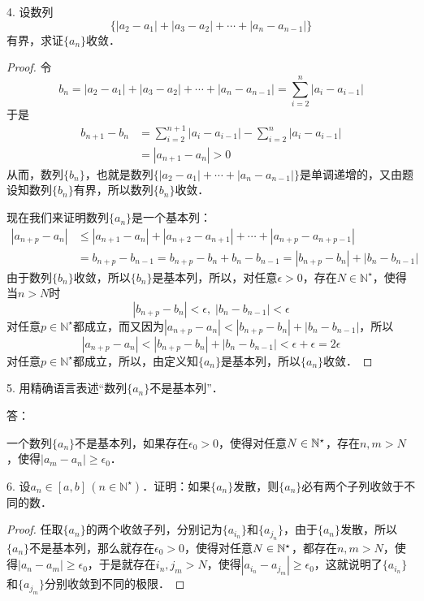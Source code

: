 4. 设数列
\begin{equation}
    \{|a_2-a_1|+|a_3-a_2|+\cdots+|a_n-a_{n-1}|\}
\end{equation}
有界，求证$\{a_n\}$收敛．
\begin{proof}
令
\begin{equation}
    b_n = |a_2-a_1|+|a_3-a_2|+\cdots+|a_n-a_{n-1}| =\sum_{i=2}^n |a_{i}-a_{i-1}|
\end{equation}
于是
\begin{align}
    b_{n+1}-b_n &= \sum_{i=2}^{n+1} |a_i - a_{i-1}| -\sum_{i=2}^{n} |a_i-a_{i-1}| \\
    &= |a_{n+1}-a_{n}| > 0
\end{align}
从而，数列$\{b_n\}$，也就是数列$\{|a_2-a_1|+\cdots+|a_{n}-a_{n-1}|\}$是单调递增的，又由题设知数列$\{b_n\}$有界，所以数列$\{b_n\}$收敛．

现在我们来证明数列$\{a_n\}$是一个基本列：
\begin{align}
    |a_{n+p}-a_n| &\leq |a_{n+1}-a_n|+|a_{n+2}-a_{n+1}|+\cdots+|a_{n+p}-a_{n+p-1}| \\
    &= b_{n+p} - b_{n-1} = b_{n+p} - b_n + b_{n} - b_{n-1} = |b_{n+p}-b_n|+|b_n-b_{n-1}|
\end{align}
由于数列$\{b_n\}$收敛，所以$\{b_n\}$是基本列，所以，对任意$\epsilon > 0$，存在$N\in\mathbb{N}^\star$，使得当$n > N$时
\begin{equation}
    |b_{n+p}-b_n|<\epsilon, \; |b_n-b_{n-1}|<\epsilon
\end{equation}
对任意$p \in \mathbb{N}^\star$都成立，而又因为$|a_{n+p}-a_n|<|b_{n+p} - b_n|+|b_{n}-b_{n-1}|$，所以
\begin{equation}
    |a_{n+p}-a_n|<|b_{n+p}-b_n|+|b_n-b_{n-1}|<\epsilon+\epsilon=2\epsilon
\end{equation}
对任意$p\in\mathbb{N}^\star$都成立，所以，由定义知$\{a_n\}$是基本列，所以$\{a_n\}$收敛．
\end{proof}
5. 用精确语言表述``数列$\{a_n\}$不是基本列''．

答：

一个数列$\{ a_n \}$不是基本列，如果存在$\epsilon_0 > 0$，使得对任意$N \in \mathbb{N}^\star$，存在$n, m > N$，使得$|a_m - a_n| \geq \epsilon_0$．

6. 设$a_n \in [a,b]\,(n\in\mathbb{N}^\star)$．证明：如果$\{a_n\}$发散，则$\{a_n\}$必有两个子列收敛于不同的数．
\begin{proof}
任取$\{ a_n \}$的两个收敛子列，分别记为$\{ a_{i_n} \}$和$\{ a_{j_n} \}$，由于$\{ a_n \}$发散，所以$\{ a_n \}$不是基本列，那么就存在$\epsilon_0 > 0$，使得对任意$N \in \mathbb{N}^\star$，都存在$n, m > N$，使得$|a_n - a_m| \geq \epsilon_0$，于是就存在$i_n, j_m > N$，使得$|a_{i_n} - a_{j_m}| \geq \epsilon_0$，这就说明了$\{ a_{i_n} \}$和$\{ a_{j_m} \}$分别收敛到不同的极限．
\end{proof}

